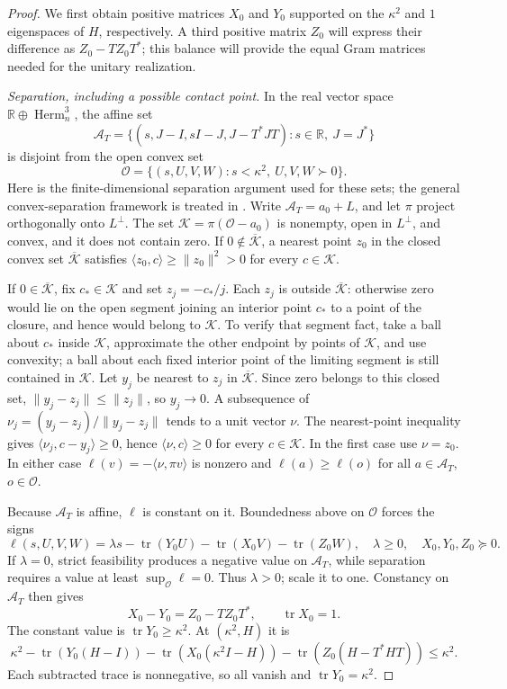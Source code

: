 \documentclass[11pt]{article}
\newcommand{\R}{\mathbb R}
\DeclareMathOperator{\tr}{tr}
\theoremstyle{definition}
\theoremstyle{remark}
\numberwithin{equation}{section}
\begin{document}
\begin{proof}
We first obtain positive matrices $X_0$ and $Y_0$ supported on the
$\kappa^2$ and $1$ eigenspaces of $H$, respectively. A third positive
matrix $Z_0$ will express their difference as $Z_0-TZ_0T^*$; this balance
will provide the equal Gram matrices needed for the unitary realization.

\emph{Separation, including a possible contact point.}
In the real vector space $\R\oplus\operatorname{Herm}_n^3$, the affine set
\[
 \mathcal A_T=\{(s,J-I,sI-J,J-T^*JT):s\in\R,\ J=J^*\}
\]
is disjoint from the open convex set
\[
 \mathcal O=\{(s,U,V,W):s<\kappa^2,\ U,V,W\succ0\}.
\]
Here is the finite-dimensional separation argument used for these sets;
the general convex-separation framework is treated in
\cite[Section 11, Theorem 11.2]{Rockafellar1970}.
Write $\mathcal A_T=a_0+L$, and let $\pi$ project orthogonally onto
$L^\perp$. The set $\mathcal K=\pi(\mathcal O-a_0)$ is nonempty, open
in $L^\perp$, and convex, and it does not contain zero. If
$0\notin\overline{\mathcal K}$, a nearest point $z_0$ in the closed convex
set $\overline{\mathcal K}$ satisfies
$\langle z_0,c\rangle\ge\|z_0\|^2>0$ for every $c\in\mathcal K$.

If $0\in\overline{\mathcal K}$, fix $c_*\in\mathcal K$ and set
$z_j=-c_*/j$. Each $z_j$ is outside $\overline{\mathcal K}$: otherwise
zero would lie on the open segment joining an interior point $c_*$ to a
point of the closure, and hence would belong to $\mathcal K$. To verify
that segment fact, take a ball about $c_*$ inside $\mathcal K$, approximate
the other endpoint by points of $\mathcal K$, and use convexity; a ball
about each fixed interior point of the limiting segment is still contained
in $\mathcal K$. Let $y_j$ be nearest to $z_j$ in
$\overline{\mathcal K}$. Since zero belongs to this closed set,
$\|y_j-z_j\|\le\|z_j\|$, so $y_j\to0$. A subsequence of
$\nu_j=(y_j-z_j)/\|y_j-z_j\|$ tends to a unit vector $\nu$.
The nearest-point inequality gives
$\langle\nu_j,c-y_j\rangle\ge0$, hence
$\langle\nu,c\rangle\ge0$ for every $c\in\mathcal K$.
In the first case use $\nu=z_0$. In either case
$\ell(v)=-\langle\nu,\pi v\rangle$ is nonzero and
$\ell(a)\ge\ell(o)$ for all $a\in\mathcal A_T$, $o\in\mathcal O$.

Because $\mathcal A_T$ is affine, $\ell$ is constant on it. Boundedness
above on $\mathcal O$ forces the signs
\[
 \ell(s,U,V,W)=\lambda s-\tr(Y_0U)-\tr(X_0V)-\tr(Z_0W),
 \quad\lambda\ge0,\quad X_0,Y_0,Z_0\succeq0.
\]
If $\lambda=0$, strict feasibility produces a negative value on
$\mathcal A_T$, while separation requires a value at least
$\sup_{\mathcal O}\ell=0$. Thus $\lambda>0$; scale it to one.
Constancy on $\mathcal A_T$ then gives
\begin{equation}\label{eq:dual}
 X_0-Y_0=Z_0-TZ_0T^*,\qquad \tr X_0=1.
\end{equation}
The constant value is $\tr Y_0\ge\kappa^2$. At $(\kappa^2,H)$ it is
\[
 \kappa^2-\tr(Y_0(H-I))-\tr(X_0(\kappa^2I-H))
            -\tr(Z_0(H-T^*HT))\le\kappa^2.
\]
Each subtracted trace is nonnegative, so all vanish and
$\tr Y_0=\kappa^2$.


\end{proof}
\end{document}
